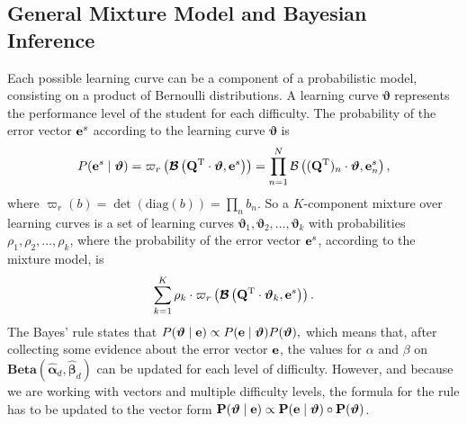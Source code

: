\documentclass{article}
\newcommand{\0}{\mathbbold{0}}
\newcommand{\1}{\mathds{1}}
\newcommand{\2}{\mathbbold{2}}
\newcommand{\T}{^{\operatorname{T}}}
\newcommand{\diag}[1]{\text{diag}\!\left(#1\right)}
\newcommand{\BBeta}[2]{\textbf{Beta}\!\left(#1,#2\right)}
\begin{document}
\subsection{General Mixture Model and Bayesian Inference}
Each possible learning curve can be a component of a probabilistic model, consisting on a product of Bernoulli distributions.
A learning curve $\boldsymbol{\vartheta}$ represents the performance level of the student for each difficulty.
The probability of the error vector ${\bf e}^s$ according to the learning curve $\boldsymbol{\vartheta}$ is
$$ P({\bf e}^s \mid \boldsymbol{\vartheta}) = \varpi_r\left(\boldsymbol{\mathcal{B}}\left({\bf Q}\T \cdot \boldsymbol{\vartheta}, {\bf e}^s\right)\right) = \prod_{n=1}^{N} \mathcal{B}\left(({\bf Q}\T)_n \cdot \boldsymbol{\vartheta}, {\bf e}^s_n \right),$$
where $\varpi_r(b) = \det\!\left(\diag{b}\right) = \prod_n b_n$.
So a $K$-component mixture over learning curves is a set of learning curves $\boldsymbol{\vartheta}_1, \boldsymbol{\vartheta}_2, \dots, \boldsymbol{\vartheta}_k$ with probabilities $\rho_1, \rho_2, \dots, \rho_k$, where the probability of the error vector ${\bf e}^s$, according to the mixture model, is
$$ \sum_{k=1}^K \rho_k \cdot \varpi_r\left(\boldsymbol{\mathcal{B}}\left({\bf Q}\T \cdot \boldsymbol{\vartheta}_k, {\bf e}^s\right)\right). $$
The Bayes' rule states that $ P(\boldsymbol{\vartheta} \mid {\bf e}) \propto P({\bf e} \mid \boldsymbol{\vartheta}) P({\boldsymbol \vartheta}), $ which means that, after collecting some evidence about the error vector ${\bf e}$, the values for $\alpha$ and $\beta$ on $\BBeta{\boldsymbol{\hat{\alpha}}_d}{\boldsymbol{\hat{\beta}}_d}$ can be updated for each level of difficulty.
However, and because we are working with vectors and multiple difficulty levels, the formula for the rule has to be updated to the vector form ${\bf P}(\boldsymbol{\vartheta} \mid {\bf e}) \propto {\bf P}({\bf e} \mid \boldsymbol{\vartheta}) \circ {\bf P}({\boldsymbol \vartheta})$.
\end{document}
